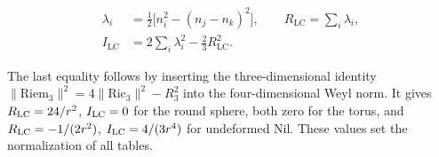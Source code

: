 \begin{equation}\tag{A-03}\label{eq:A-03}
\begin{aligned}
\lambda_i&=\frac12\big[n_i^2-(n_j-n_k)^2\big],\qquad
R_{\mathrm{LC}}=\sum_i\lambda_i,\\
I_{\mathrm{LC}}&=2\sum_i\lambda_i^2-\frac23R_{\mathrm{LC}}^2.
\end{aligned}
\end{equation}

The last equality follows by inserting the three-dimensional identity $\lVert\mathrm{Riem}_3\rVert^2=4\lVert\mathrm{Ric}_3\rVert^2-R_3^2$ into the four-dimensional Weyl norm. It gives $R_{\rm LC}=24/r^2$, $I_{\rm LC}=0$ for the round sphere, both zero for the torus, and $R_{\rm LC}=-1/(2r^2)$, $I_{\rm LC}=4/(3r^4)$ for undeformed Nil. These values set the normalization of all tables.
